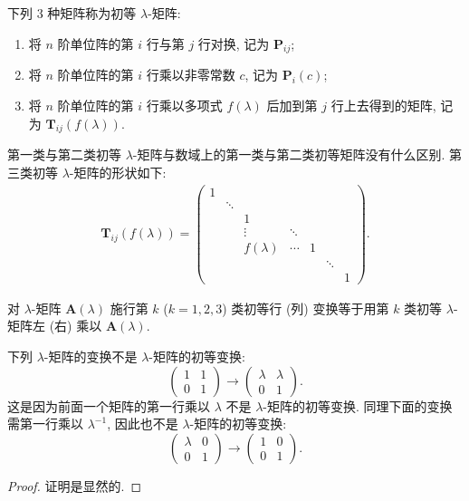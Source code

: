 \documentclass[../../main.tex]{subfiles}%
\begin{document}
\begin{definition}[初等$\lambda$-矩阵]
下列 3 种矩阵称为初等 $\lambda$-矩阵:
\begin{enumerate}[(1)]
\item 将 $n$ 阶单位阵的第 $i$ 行与第 $j$ 行对换, 记为 $\boldsymbol{P}_{ij}$;

\item 将 $n$ 阶单位阵的第 $i$ 行乘以非零常数 $c$, 记为 $\boldsymbol{P}_{i}(c)$;

\item 将 $n$ 阶单位阵的第 $i$ 行乘以多项式 $f(\lambda)$ 后加到第 $j$ 行上去得到的矩阵, 记为 $\boldsymbol{T}_{ij}(f(\lambda))$.
\end{enumerate}
\end{definition}
\begin{remark}
第一类与第二类初等 $\lambda$-矩阵与数域上的第一类与第二类初等矩阵没有什么区别. 第三类初等 $\lambda$-矩阵的形状如下:
\begin{align*}
\boldsymbol{T}_{ij}(f(\lambda))=
\begin{pmatrix}
1 & & & & & \\
& \ddots & & & & \\
& & 1 & & & \\
& & \vdots & \ddots & & \\
& & f(\lambda) & \cdots & 1 & \\
& & & & & \ddots & \\
& & & & & & 1
\end{pmatrix}.
\end{align*} 
\end{remark}

\begin{theorem}
对 $\lambda$-矩阵 $\boldsymbol{A}(\lambda)$ 施行第 $k$ ($k = 1,2,3$) 类初等行 (列) 变换等于用第 $k$ 类初等 $\lambda$-矩阵左 (右) 乘以 $\boldsymbol{A}(\lambda)$. 
\end{theorem}
\begin{remark}
下列 $\lambda$-矩阵的变换不是 $\lambda$-矩阵的初等变换:
\[
\begin{pmatrix}
1 & 1 \\
0 & 1
\end{pmatrix}
\rightarrow
\begin{pmatrix}
\lambda & \lambda \\
0 & 1
\end{pmatrix}.
\]
这是因为前面一个矩阵的第一行乘以 $\lambda$ 不是 $\lambda$-矩阵的初等变换. 同理下面的变换需第一行乘以 $\lambda^{-1}$, 因此也不是 $\lambda$-矩阵的初等变换:
\[
\begin{pmatrix}
\lambda & 0 \\
0 & 1
\end{pmatrix}
\rightarrow
\begin{pmatrix}
1 & 0 \\
0 & 1
\end{pmatrix}.
\] 
\end{remark}
\begin{proof}
证明是显然的.
\end{proof}
\end{document}
